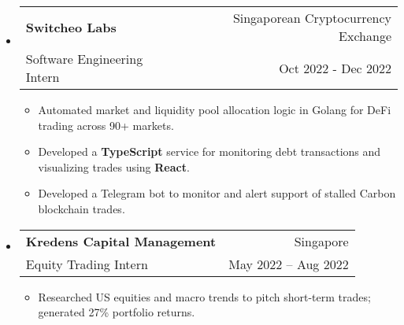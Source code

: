 \documentclass[letterpaper, 11pt]{article}
\makeatletter
\def\sectionlineskip{\medskip}
\def\sectionskip{\medskip}
\newcommand{\SectionHeading}[1]{
  \sectionskip
  \raggedright\raggedbottom\MakeUppercase{\large{#1}}
  \sectionlineskip
  \hrule
  \color{black}
}
\newcommand{\ResumeEntryTSDL}[4]{
  \vspace{1pt}\item
    \begin{tabular*}{\textwidth}[t]{l@{\extracolsep{\fill}}r} 
      \textbf{#1} & #2 \\
      #3 & #4 \\
    \end{tabular*}\vspace{-2.835pt} %
}
\newcommand{\ResumeItemDefault}[1]{
  \item{
    #1 \vspace{-2.835pt}
  }
}
\newcommand{\ResumeEntryStart}{\begin{itemize}[leftmargin=0mm, label={}]}
\newcommand{\ResumeEntryEnd}{\end{itemize}\vspace{-2.835pt}} %
\newcommand{\ResumeItemListStart}{\begin{itemize}[leftmargin=5mm, label=$\bullet$, itemsep=1mm, parsep=1mm]} %
\newcommand{\ResumeItemListEnd}{\end{itemize}}
\newcommand{\OpenSourceProjectItem}[3]{
  \item{
    \href{#1}{\textbf{#2} }\hfill{#3}\vspace{-2.835pt}
  }
}
\makeatother
\begin{document}
  \ResumeEntryStart
    \ResumeEntryTSDL{Switcheo Labs}{Singaporean Cryptocurrency Exchange}{Software Engineering Intern}{Oct 2022 - Dec 2022}
    \ResumeItemListStart
    \ResumeItemDefault{Automated market and liquidity pool allocation logic in Golang for DeFi trading across 90+ markets.}
    \ResumeItemDefault{Developed a \textbf{TypeScript} service for monitoring debt transactions and visualizing trades using \textbf{React}.}
    \ResumeItemDefault{Developed a Telegram bot to monitor and alert support of stalled Carbon blockchain trades.}
    \ResumeItemListEnd
  \ResumeEntryEnd



  \ResumeEntryStart
  \ResumeEntryTSDL{Kredens Capital Management}{Singapore}{Equity Trading Intern}{May 2022 – Aug 2022}
    \ResumeItemListStart
      \ResumeItemDefault{Researched US equities and macro trends to pitch short-term trades; generated 27\% portfolio returns.}
    \ResumeItemListEnd
  \ResumeEntryEnd
\end{document}
